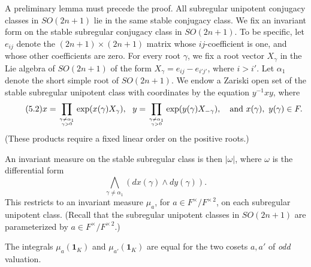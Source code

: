 \documentclass{amsart}
\begin{document}
A preliminary lemma must precede the proof.
All subregular unipotent conjugacy
classes in $SO(2n+1)$ lie in the same stable conjugacy
class.  We fix an invariant form on the
stable subregular conjugacy class in $SO(2n+1)$.  To be
specific, let $e_{ij}$ denote the $(2n+1)\times(2n+1)$ matrix
whose ${ij}$-coefficient is one, and whose other coefficients
are zero. For every root $\gamma$, we
fix a root vector $X_\gamma$
in the Lie algebra of
$SO(2n+1)$ of the form $X_\gamma=e_{ij} - e_{i'j'}$, where
$i>i'$.  Let $\alpha_1$ denote the short simple root of $SO(2n+1)$.
We endow a Zariski open set of the stable subregular
unipotent class with coordinates by the equation $y^{-1} x y$, where 
\begin{equation}\tag{5.2}
x = \prod_{\gamma\ne\alpha_1\atop \gamma>0} \exp(
x(\gamma) X_\gamma),\ \ 
y = \prod_{\gamma\ne\alpha_1\atop\gamma>0}\exp(
y(\gamma) X_{-\gamma}),\quad\hbox{and } x(\gamma),\ y(\gamma)\in F.
\end{equation}
  (These
products require a fixed linear order on the positive roots.)

An invariant measure on the stable subregular class is then
$|\omega|$, where $\omega$ is the differential form
$$\bigwedge_{\gamma\ne\alpha_1} (dx(\gamma)\wedge dy(\gamma)).$$
This restricts to
an invariant measure $\mu_a$, for $a\in F^\times/
F^{\times\,2}$, on each subregular unipotent class.  
(Recall that the subregular unipotent classes in $SO(2n+1)$
are parameterized by $a\in F^\times/F^{\times\,2}$.)

  The integrals $\mu_a({\pmb 1}_K)$ and
$\mu_{a'}({\pmb 1}_K)$ are equal for the two 
cosets $a,a'$ of {\it odd} valuation.
\endproclaim
\end{document}
